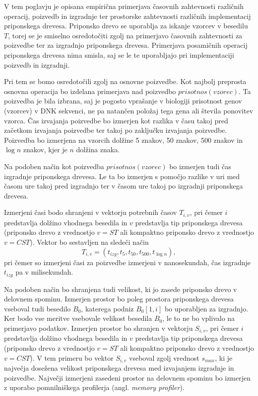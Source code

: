 V tem poglavju je opisana empirična primerjava časovnih zahtevnosti različnih operacij, poizvedb in izgradnje ter prostorske zahtevnosti različnih implementacij priponskega drevesa. Priponsko drevo se uporablja za iskanje vzorcev v besedilu $T$, torej se je smiselno osredotočiti zgolj na primerjavo časovnih zahtevnosti za poizvedbe ter za izgradnjo priponskega drevesa. Primerjava posamičnih operacij priponskega drevesa nima smisla, saj se le te uporabljajo pri implementaciji poizvedb in izgradnji. 

Pri tem se bomo osredotočili zgolj na osnovne poizvedbe. Kot najbolj preprosta osnovna operacija bo izdelana primerjava nad poizvedbo $prisotnos(vzorec)$. Ta poizvedba je bila izbrana, saj je pogosto vprašanje v biologiji prisotnost genov (vzorcev) v DNK sekvenci, ne pa natančen položaj tega gena ali števila ponovitev vzorca. Čas izvajanja poizvedbe bo izmerjen kot razlika v času takoj pred začetkom izvajanja poizvedbe ter takoj po zaključku izvajanja poizvedbe. Poizvedba bo izmerjena na vzorcih dolžine 5 znakov, 50 znakov, 500 znakov in $\log{n}$ znakov, kjer je $n$ dolžina znaka. 

Na podoben način kot poizvedba $prisotnos(vzorec)$ bo izmerjen tudi čas izgradnje priponskega drevesa. Le ta bo izmerjen s pomočjo razlike v uri med časom ure takoj pred izgradnjo ter v časom ure takoj po izgradnji priponskega drevesa.

Izmerjeni časi bodo shranjeni v vektorju potrebnih časov $T_{i,v}$, pri čemer $i$ predstavlja dolžino vhodnega besedila in $v$ predstavlja tip priponskega drevesa (priponsko drevo z vrednostjo $v=ST$ ali kompaktno priponsko drevo z vrednostjo $v=CST$). Vektor bo sestavljen na sledeči način
\begin{equation*}
    T_{i,v}=(t_{izg},t_5,t_{50},t_{500},t_{\log{n}}),
\end{equation*}
pri čemer so izmerjeni časi za poizvedbe izmerjeni v nanosekundah, čas izgradnje $t_{izg}$ pa v milisekundah. 

Na podoben način bo shranjena tudi velikost, ki jo zasede priponsko drevo v delovnem spominu. Izmerjen prostor bo poleg prostora priponskega drevesa vseboval tudi besedilo $B_{0}$, katerega podniz $B_0[1,i]$ bo uporabljen za izgradnjo. Ker bodo vse meritve vsebovale velikost besedila $B_0$, le to ne bo vplivalo na primerjavo podatkov. Izmerjen prostor bo shranjen v vektorju $S_{i,v}$, pri čemer $i$ predstavlja dolžino vhodnega besedila in $v$ predstavlja tip priponskega drevesa (priponsko drevo z vrednostjo $v=ST$ ali kompaktno priponsko drevo z vrednostjo $v=CST$). V tem primeru bo vektor $S_{i,v}$ vseboval zgolj vrednost $s_{max}$, ki je največja dosežena velikost priponskega drevesa med izvajanjem izgradnje in poizvedbe. Največji izmerjeni zasedeni prostor na delovnem spominu bo izmerjen z uporabo pomnilniškega profilerja (angl. \textit{memory profiler}).

